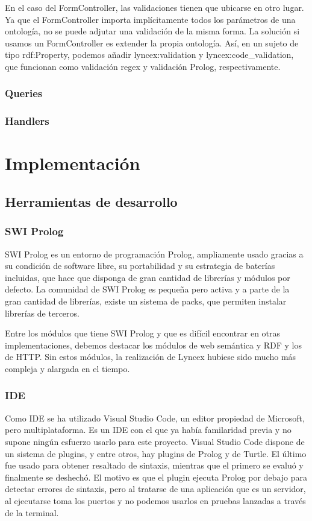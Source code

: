 \documentclass[12pt]{report} %
\begin{document}
En el caso del FormController, las validaciones tienen que ubicarse en otro lugar. Ya que el FormController importa implícitamente todos los parámetros de una ontología, no se puede adjutar una validación de la misma forma.
La solución si usamos un FormController es extender la propia ontología.
Así, en un sujeto de tipo rdf:Property, podemos añadir lyncex:validation y lyncex:code\_validation, que funcionan como validación regex y validación Prolog, respectivamente.

\subsection{Queries}

\subsection{Handlers}

\chapter{Implementación}

\section{Herramientas de desarrollo}
\subsection{SWI Prolog}
SWI Prolog\cite{prolog} es un entorno de programación Prolog, ampliamente usado gracias a su condición de software libre, su portabilidad y 
su estrategia de baterías incluidas, que hace que disponga de gran cantidad de librerías y módulos por defecto.
La comunidad de SWI Prolog es pequeña pero activa y a parte de la gran cantidad de librerías, existe un sistema de packs, que permiten instalar librerías de terceros.

Entre los módulos que tiene SWI Prolog y que es difícil encontrar en otras implementaciones, debemos destacar los módulos de web semántica y RDF y los de HTTP.
Sin estos módulos, la realización de Lyncex hubiese sido mucho más compleja y alargada en el tiempo.

\subsection{IDE}
Como IDE se ha utilizado Visual Studio Code\cite{vscode}, un editor propiedad de Microsoft, pero multiplataforma.
Es un IDE con el que ya había familaridad previa y no supone ningún esfuerzo usarlo para este proyecto.
Visual Studio Code dispone de un sistema de plugins, y entre otros, hay plugins de Prolog y de Turtle.
El último fue usado para obtener resaltado de sintaxis, mientras que el primero se evaluó y finalmente se deshechó.
El motivo es que el plugin ejecuta Prolog por debajo para detectar errores de sintaxis, pero al tratarse de una aplicación que es un servidor, al ejecutarse toma los puertos y no podemos usarlos
en pruebas lanzadas a través de la terminal.
\end{document}
